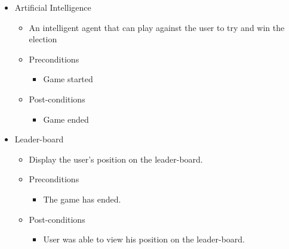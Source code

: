 \documentclass{article}
\begin{document}
	\begin{itemize}
		\item Artificial Intelligence
			\begin{itemize}
				\item An intelligent agent that can play against the user to try and win the election
				\item Preconditions
				\begin{itemize}
					\item Game started
				\end{itemize}
				\item Post-conditions
				\begin{itemize}
					\item Game ended
				\end{itemize}
			\end{itemize}
	\end{itemize}
	\begin{itemize}
		\item Leader-board
			\begin{itemize}
				\item Display the user's position on the leader-board.
				\item Preconditions
				\begin{itemize}	
					\item The game has ended.
				\end{itemize}
				\item Post-conditions
				\begin{itemize}	
					\item User was able to view his position on the leader-board.
				\end{itemize}
			\end{itemize}
	\end{itemize}
	
\end{document}
